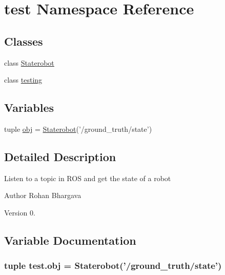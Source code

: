 \hypertarget{namespacetest}{\section{test Namespace Reference}
\label{namespacetest}
}
\subsection*{Classes}
\begin{DoxyCompactItemize}
\item 
class \hyperlink{classtest_1_1_staterobot}{Staterobot}
\item 
class \hyperlink{classtest_1_1testing}{testing}
\end{DoxyCompactItemize}
\subsection*{Variables}
\begin{DoxyCompactItemize}
\item 
tuple \hyperlink{namespacetest_adf753579d10a80fa8ab7e3763b1089be}{obj} = \hyperlink{classtest_1_1_staterobot}{Staterobot}('/ground\+\_\+truth/state')
\end{DoxyCompactItemize}


\subsection{Detailed Description}
\begin{DoxyVerb}Listen to a topic in ROS and get the state of a robot\end{DoxyVerb}


\begin{DoxyAuthor}{Author}
Rohan Bhargava 
\end{DoxyAuthor}
\begin{DoxyVersion}{Version}
0. 
\end{DoxyVersion}


\subsection{Variable Documentation}
\hypertarget{namespacetest_adf753579d10a80fa8ab7e3763b1089be}{
\subsubsection[{obj}]{\setlength{\rightskip}{0pt plus 5cm}tuple test.\+obj = {\bf Staterobot}('/ground\+\_\+truth/state')}}\label{namespacetest_adf753579d10a80fa8ab7e3763b1089be}
